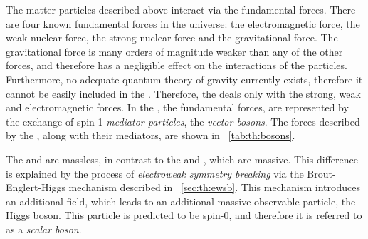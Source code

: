 The matter particles described above interact via the fundamental forces. There are four known fundamental forces in the universe: the electromagnetic force, the weak nuclear force, the strong nuclear force and the gravitational force. The gravitational force is many orders of magnitude weaker than any of the other forces, and therefore has a negligible effect on the interactions of the \SM particles. Furthermore, no adequate quantum theory of gravity currently exists, therefore it cannot be easily included in the \SM. Therefore, the \SM deals only with the strong, weak and electromagnetic forces. In the \SM, the fundamental forces, are represented by the exchange of spin-1 \emph{mediator particles}, the \emph{vector bosons}. 
The forces described by the \SM, along with their mediators, are shown in \Tab~\ref{tab:th:bosons}.

\begin{table}[h!]
 \caption{The three fundamental forces considered by the \SM are presented. For each force, the approximate strength relative to the strong force is shown, assuming two fundamental particles separated by a distance of $10^{-15}\m$. The mediator particle of each force is indicated along with its measured mass.\cite{Thomson:2013zua}}
\label{tab:th:bosons}
  \end{table}

The \Pphoton and \Pgluon are massless, in contrast to the \PWpm and \PZzero, which are massive. This difference is explained by the process of \emph{electroweak symmetry breaking} via the Brout-Englert-Higgs mechanism described in \Sec~\ref{sec:th:ewsb}. This mechanism introduces an additional field, which leads to an additional massive observable particle, the Higgs boson. This particle is predicted to be spin-$0$, and therefore it is referred to as a \emph{scalar boson}.

